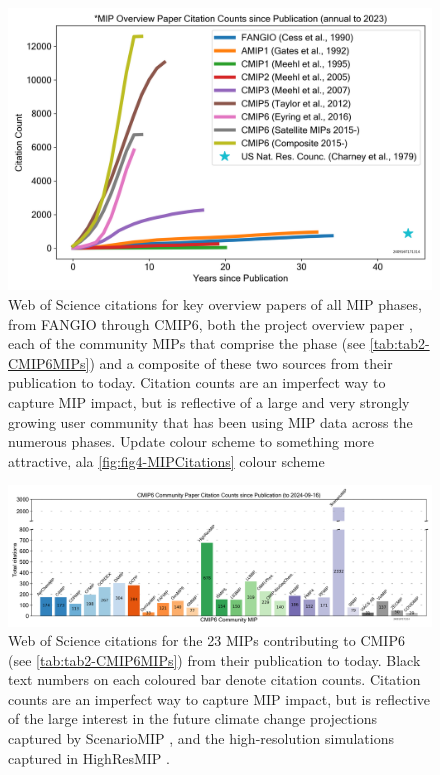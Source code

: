 \documentclass[gmd, preprint]{copernicus}
\def\cred#1{{\color{red}#1}}
\begin{document}
\begin{figure}
    \centering
    \includegraphics[width=1\linewidth]{240916T171314_CMIPOverviewPaperCitations-Counts-3.png}
    \caption{Web of Science citations for key overview papers of all MIP phases, from FANGIO \citep{cess_intercomparison_1990} through CMIP6, both the project overview paper \citep{eyring_overview_2016}, each of the community MIPs that comprise the phase (see \autoref{tab:tab2-CMIP6MIPs}) and a composite of these two sources from their publication to today. Citation counts are an imperfect way to capture MIP impact, but is reflective of a large and very strongly growing user community that has been using MIP data across the numerous phases. \cred{Update colour scheme to something more attractive, ala \autoref{fig:fig4-MIPCitations} colour scheme}}
    \label{fig:fig3-MIPPhaseCitations}
\end{figure}

\begin{figure}
    \centering
    \includegraphics[width=\textwidth]{240916T171314_CMIPOverviewPaperCitations-Counts-2b-bar.png}
    \caption{Web of Science citations for the 23 MIPs contributing to CMIP6 (see \autoref{tab:tab2-CMIP6MIPs}) from their publication to today. Black text numbers on each coloured bar denote citation counts. Citation counts are an imperfect way to capture MIP impact, but is reflective of the large interest in the future climate change projections captured by ScenarioMIP \citep{oneill_scenario_2016}, and the high-resolution simulations captured in HighResMIP \citep{haarsma_high_2016}.}
    \label{fig:fig4-MIPCitations}
\end{figure}
\end{document}
